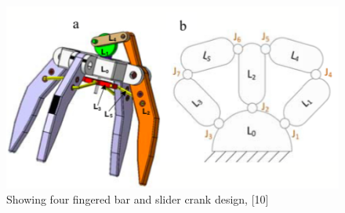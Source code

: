 \documentclass{l4proj}
\begin{document}
\begin{figure}[!ht]
  \centering
  \includegraphics[width=0.75\linewidth]{images/fourfingered.png}   

  \caption{Showing four fingered bar and slider crank design, [10]}
\end{figure}
\end{document}

